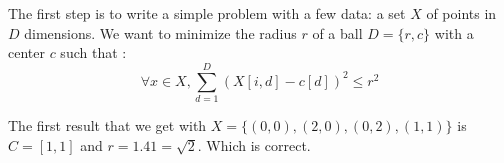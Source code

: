 The first step is to write a simple problem with a few data:
a set $X$ of points in $D$ dimensions.
We want to minimize the radius $r$ of a ball $D = \{r,c\}$ with a center $c$ such that :
$$ \forall x \in X, \sum_{d = 1}^D (X[i,d] - c[d]) ^ 2 \leq r ^ 2$$

The first result that we get with $X = \{(0,0),(2,0),(0,2),(1,1)\}$ is $C = [1,1]$ and $r = 1.41 = \sqrt{2}$. Which is correct.


